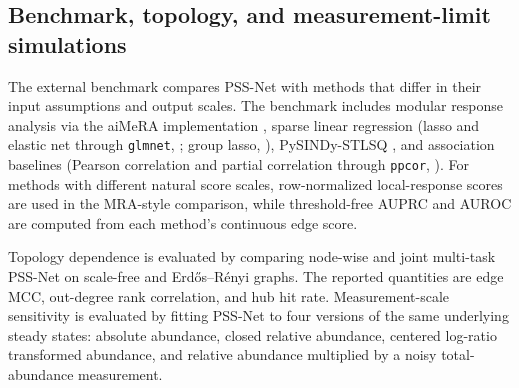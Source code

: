 \subsection{Benchmark, topology, and measurement-limit simulations}
\label{sec:sim:benchmark}

The external benchmark compares PSS-Net with methods that differ in their input
assumptions and output scales.  The benchmark includes modular response analysis
\citep[MRA;][]{kholodenko2002untangling} via the aiMeRA implementation
\citep{jimenezdominguez2021aimera}, sparse linear regression (lasso and elastic
net through \texttt{glmnet}, \citealp{friedman2010glmnet}; group lasso,
\citealp{lounici2011group}), PySINDy-STLSQ
\citep{brunton2016sindy,kaptanoglu2022pysindy}, and association baselines
(Pearson correlation and partial correlation through \texttt{ppcor},
\citealp{kim2015ppcor}).  For methods with different natural score scales,
row-normalized local-response scores are used in the MRA-style comparison, while
threshold-free AUPRC and AUROC are computed from each method's continuous edge
score.

Topology dependence is evaluated by comparing node-wise and joint multi-task
PSS-Net on scale-free and Erd\H{o}s--R\'enyi graphs.  The reported quantities are
edge MCC, out-degree rank correlation, and hub hit rate.  Measurement-scale
sensitivity is evaluated by fitting PSS-Net to four versions of the same
underlying steady states: absolute abundance, closed relative abundance,
centered log-ratio transformed abundance, and relative abundance multiplied by a
noisy total-abundance measurement.
